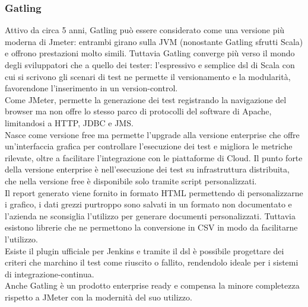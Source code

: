 \subsubsection{Gatling}
Attivo da circa 5 anni, Gatling può essere considerato come una versione più moderna di Jmeter: entrambi girano sulla JVM (nonostante Gatling sfrutti Scala) e offrono prestazioni molto simili. Tuttavia Gatling converge più verso il mondo degli sviluppatori che a quello dei tester: l'espressivo e semplice \gls{dsl} di Scala con cui si scrivono gli scenari di test ne permette il versionamento e la modularità, favorendone l'inserimento in un \gls{version-control}. \\
Come JMeter, permette la generazione dei test registrando la navigazione del browser ma non offre lo stesso parco di protocolli del software di Apache, limitandosi a HTTP, JDBC e JMS. \\
Nasce come versione free ma permette l’upgrade alla versione enterprise che offre un'interfaccia grafica per controllare l'esecuzione dei test e migliora le metriche rilevate, oltre a facilitare l’integrazione con le piattaforme di Cloud. Il punto forte della versione enterprise è nell'esecuzione dei test su infrastruttura distribuita, che nella versione free è disponibile solo tramite script personalizzati. \\
Il report generato viene fornito in formato HTML permettendo di personalizzarne i grafico, i dati grezzi purtroppo sono salvati in un formato non documentato e l'azienda ne sconsiglia l'utilizzo per generare documenti personalizzati. Tuttavia esistono librerie che ne permettono la conversione in CSV in modo da facilitarne l'utilizzo.\\
Esiste il plugin ufficiale per Jenkins e tramite il \gls{dsl} è possibile progettare dei criteri che marchino il test come riuscito o fallito, rendendolo ideale per i sistemi di \gls{integrazione-continua}.\\
Anche Gatling è un prodotto enterprise ready e compensa la minore completezza rispetto a JMeter con la modernità del suo utilizzo.
